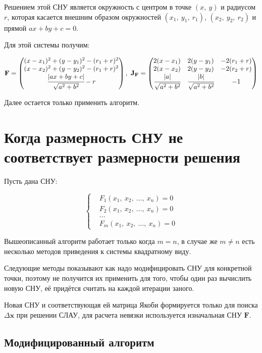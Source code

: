 \documentclass[12pt, a4paper]{article}
\begin{document}
Решением этой СНУ является окружность с центром в точке $(x,\ y)$ и радиусом $r$, которая касается внешним образом окружностей $(x_1,\ y_1,\ r_1)$, $(x_2,\ y_2,\ r_2)$ и прямой $ax + by + c = 0$.

Для этой системы получим:

$$
\mathbf{F} = \begin{pmatrix}
	(x-x_1)^2 + (y-y_1)^2 - (r_1 + r)^2 \\
	(x-x_2)^2 + (y-y_2)^2 - (r_1 + r)^2 \\
	\cfrac{|ax + by + c|}{\sqrt{a^2 + b^2}} - r
\end{pmatrix},\
\mathbf{J}_\mathbf{F} = \begin{pmatrix}
	2(x-x_1) & 2(y-y_1) & -2(r_1 + r) \\
	2(x-x_2) & 2(y-y_2) & -2(r_2 + r) \\
	\cfrac{|a|}{\sqrt{a^2 + b^2}} & \cfrac{|b|}{\sqrt{a^2 + b^2}} & -1
\end{pmatrix}
$$

Далее остается только применить алгоритм.

\section{Когда размерность СНУ не соответствует размерности решения}

Пусть дана СНУ:

$$\left\{
\begin{aligned}
	&F_1(x_1,\ x_2,\ \dots,\ x_n) = 0 \\
	&F_2(x_1,\ x_2,\ \dots,\ x_n) = 0 \\
	&\dots \\
	&F_m(x_1,\ x_2,\ \dots,\ x_n) = 0
\end{aligned}
\right.
$$

Вышеописанный алгоритм работает только когда $m=n$, в случае же $m\neq n$ есть несколько методов приведения к системы квадратному виду.

Следующие методы показывают как надо модифицировать СНУ для конкретной точки, поэтому не получится их применить для того, чтобы один раз вычислить новую СНУ, её придётся считать на каждой итерации заного.

Новая СНУ и соответствующая ей матрица Якоби формируется только для поиска $\Delta\mathbf{x}$ при решении СЛАУ, для расчета невязки используется изначальная СНУ $\mathbf{F}$.

\subsection{Модифицированный алгоритм}
\end{document}
